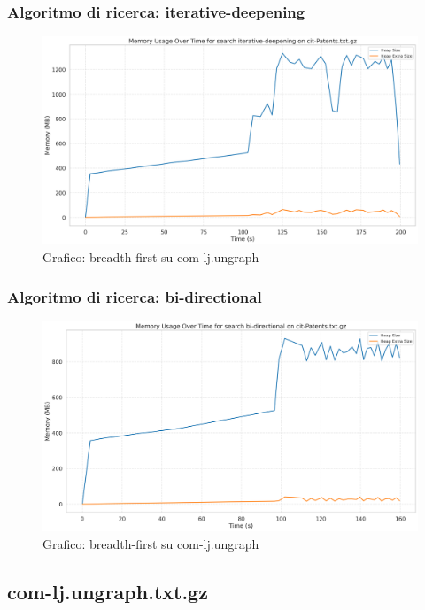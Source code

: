 \documentclass{article}
\begin{document}
\subsubsection{Algoritmo di ricerca: iterative-deepening}
\begin{figure}[htbp]\centering
\includegraphics[width=\textwidth]{../plots/cit-Patents_iterative-deepening.png}
\caption{Grafico: breadth-first su com-lj.ungraph}
\end{figure}
\subsubsection{Algoritmo di ricerca: bi-directional}
\begin{figure}[htbp]\centering
\includegraphics[width=\textwidth]{../plots/cit-Patents_bi-directional.png}
\caption{Grafico: breadth-first su com-lj.ungraph}
\end{figure}
\subsection{com-lj.ungraph.txt.gz}
\end{document}
